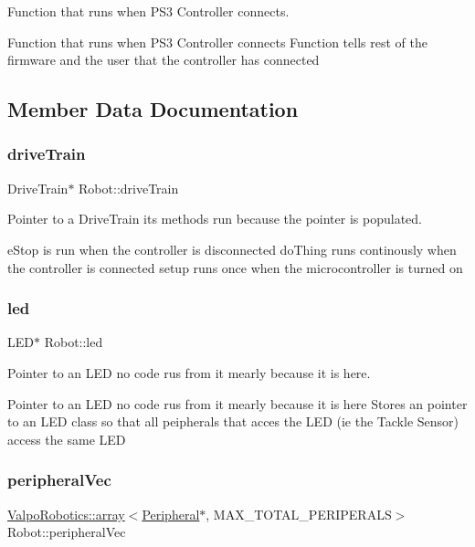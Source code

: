 Function that runs when P\+S3 Controller connects. 

Function that runs when P\+S3 Controller connects Function tells rest of the firmware and the user that the controller has connected 

\subsection{Member Data Documentation}
\mbox{\label{class_robot_a4b499841182a38720a26a493fa98363a}} 
\subsubsection{\texorpdfstring{drive\+Train}{driveTrain}}
{\footnotesize\ttfamily Drive\+Train$\ast$ Robot\+::drive\+Train\hspace{0.3cm}{\ttfamily [protected]}}



Pointer to a Drive\+Train its methods run because the pointer is populated. 

e\+Stop is run when the controller is disconnected do\+Thing runs continously when the controller is connected setup runs once when the microcontroller is turned on \mbox{\label{class_robot_a28c6c49c9a12c8767e118e0e8a4165cf}} 
\subsubsection{\texorpdfstring{led}{led}}
{\footnotesize\ttfamily L\+ED$\ast$ Robot\+::led\hspace{0.3cm}{\ttfamily [protected]}}



Pointer to an L\+ED no code rus from it mearly because it is here. 

Pointer to an L\+ED no code rus from it mearly because it is here Stores an pointer to an L\+ED class so that all peipherals that acces the L\+ED (ie the Tackle Sensor) access the same L\+ED \mbox{\label{class_robot_a8db438771a3e7dc9d2cf5dd2e1d25f74}} 
\subsubsection{\texorpdfstring{peripheral\+Vec}{peripheralVec}}
{\footnotesize\ttfamily \mbox{\hyperlink{class_valpo_robotics_1_1array}{Valpo\+Robotics\+::array}}$<$\mbox{\hyperlink{class_peripheral}{Peripheral}}$\ast$, M\+A\+X\+\_\+\+T\+O\+T\+A\+L\+\_\+\+P\+E\+R\+I\+P\+E\+R\+A\+LS$>$ Robot\+::peripheral\+Vec\hspace{0.3cm}{\ttfamily [protected]}}



